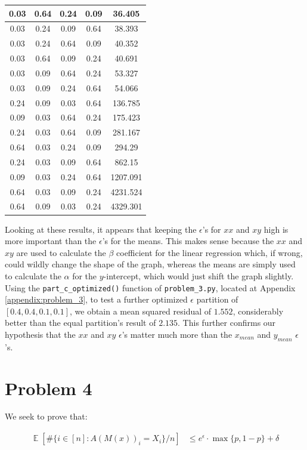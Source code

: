 \documentclass[12pt]{article}
\DeclareMathOperator*{\E}{\mathbb{E}}
\def\cl{\lstinline}
\begin{document}
\begin{center}
\begin{tabular}{|c|c|c|c|c|}
0.03 & 0.64 & 0.24 & 0.09&36.405\\ \hline
0.03 & 0.24 & 0.09 & 0.64&38.393\\ \hline
0.03 & 0.24 & 0.64 & 0.09&40.352\\ \hline
0.03 & 0.64 & 0.09 & 0.24&40.691\\ \hline
0.03 & 0.09 & 0.64 & 0.24&53.327\\ \hline
0.03 & 0.09 & 0.24 & 0.64&54.066\\ \hline
0.24 & 0.09 & 0.03 & 0.64&136.785\\ \hline
0.09 & 0.03 & 0.64 & 0.24&175.423\\ \hline
0.24 & 0.03 & 0.64 & 0.09&281.167\\ \hline
0.64 & 0.03 & 0.24 & 0.09&294.29\\ \hline
0.24 & 0.03 & 0.09 & 0.64&862.15\\ \hline
0.09 & 0.03 & 0.24 & 0.64&1207.091\\ \hline
0.64 & 0.03 & 0.09 & 0.24&4231.524\\ \hline
0.64 & 0.09 & 0.03 & 0.24&4329.301\\ \hline
\end{tabular}
\end{center}

Looking at these results, it appears that keeping the $\epsilon$'s for $xx$ and $xy$ high is more important than the $\epsilon$'s for the means. This makes sense because the $xx$ and $xy$ are used to calculate the $\beta$ coefficient for the linear regression which, if wrong, could wildly change the shape of the graph, whereas the means are simply used to calculate the $\alpha$ for the $y$-intercept, which would just shift the graph slightly. Using the \cl{part_c_optimized()} function of \cl{problem_3.py}, located at Appendix \ref{appendix:problem_3}, to test a further optimized $\epsilon$ partition of $[0.4, 0.4, 0.1, 0.1]$, we obtain a mean squared residual of $1.552$, considerably better than the equal partition's result of $2.135$. This further confirms our hypothesis that the $xx$ and $xy$ $\epsilon$'s matter much more than the $x_{mean}$ and $y_{mean}$ $\epsilon$'s.

\newpage

\section{Problem 4}

We seek to prove that:

\begin{align*}
\E[\#\{i \in [n]: A(M(x))_i = X_i\}/n] &\leq e^\epsilon \cdot \max\{p, 1-p\} + \delta \\
\end{align*}
\end{document}
